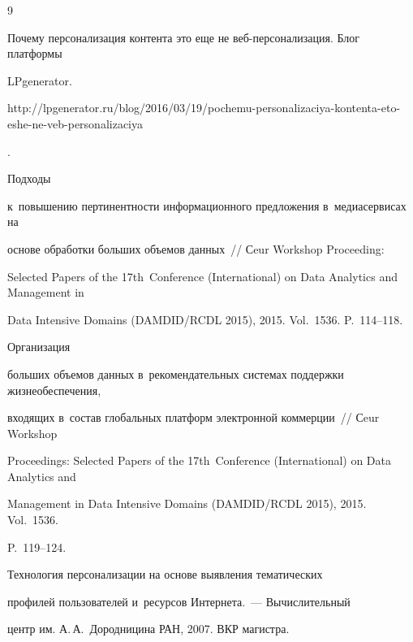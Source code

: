 {\small\frenchspacing


{%




\begin{thebibliography}{9}





\vspace*{-2pt}




Почему персонализация контента это еще не веб-персонализация. Блог платформы 


LPgenerator. {\sf 


http://lpgenerator.ru/blog/2016/03/19/pochemu-personalizaciya-kontenta-eto-eshe-ne-veb-personalizaciya}. 




 Подходы 


к~повышению пертинентности информационного предложения в~медиасервисах на 


основе обработки больших объемов данных~/\!\!/ Сeur Workshop Proceeding: 


Selected Papers of the 17th~Conference (International) on Data Analytics and Management in 


Data Intensive Domains (DAMDID/RCDL 2015), 2015. Vol.~1536. P.~114--118.




 Организация 


больших объемов данных в~рекомендательных системах поддержки жизнеобеспечения, 


входящих в~состав глобальных платформ электронной коммерции~/\!\!/ Сeur Workshop 


Proceedings: Selected Papers of the 17th~Conference (International) on Data Analytics and 


Management in Data Intensive Domains (DAMDID/RCDL 2015), 2015. Vol.~1536.  


P.~119--124.




 Технология персонализации на основе выявления тематических 


профилей пользователей и~ресурсов Интернета.~--- Вычислительный 


центр им. А.\,А.~Дородницина РАН, 2007.  ВКР магистра.



\end{thebibliography}}}
